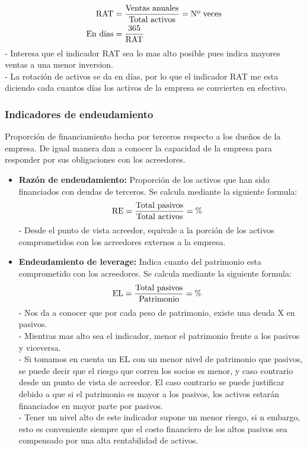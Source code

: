 \documentclass{templateNote}
\begin{document}
\begin{itemize}
    \begin{align*}
        \textnormal{RAT} &= \frac{\textnormal{Ventas anuales}}{\textnormal{Total activos}} = \textnormal{Nº veces} \\
        \textnormal{En días} &= \frac{365}{\textnormal{RAT}}
    \end{align*} 
    - Interesa que el indicador RAT sea lo mas alto posible pues indica mayores ventas a una menor inversion. \\
    - La rotación de activos se da en días, por lo que el indicador RAT me esta diciendo cada cuantos días los activos de la empresa se convierten en efectivo.
\end{itemize}

\subsubsection{Indicadores de endeudamiento}
\noindent Proporción de financiamiento hecha por terceros respecto a los dueños de la empresa. De igual manera dan a conocer la capacidad de la empresa para responder por 
sus obligaciones con los acreedores.

\begin{itemize}
    \item \textbf{Razón de endeudamiento:} Proporción de los activos que han sido financiados con deudas de terceros. Se calcula mediante la siguiente formula:
    \begin{align*}
        \textnormal{RE} &= \frac{\textnormal{Total pasivos}}{\textnormal{Total activos}} = \%
    \end{align*}
    - Desde el punto de vista acreedor, equivale a la porción de los activos comprometidos con los acreedores externos a la empresa.
    \item \textbf{Endeudamiento de leverage:} Indica cuanto del patrimonio esta comprometido con los acreedores. Se calcula mediante la siguiente formula: 
    \begin{align*}
        \textnormal{EL} &= \frac{\textnormal{Total pasivos}}{\textnormal{Patrimonio}} = \%
    \end{align*}
    - Nos da a conocer que por cada peso de patrimonio, existe una deuda X en pasivos. \\
    - Mientras mas alto sea el indicador, menor el patrimonio frente a los pasivos y viceversa. \\
    - Si tomamos en cuenta un EL con un menor nivel de patrimonio que pasivos, se puede decir que el riesgo que corren los socios es menor, y caso contrario desde un punto de vista de acreedor. El caso
    contrario se puede justificar debido a que si el patrimonio es mayor a los pasivos, los activos estarán financiados en mayor parte por pasivos. \\
    - Tener un nivel alto de este indicador supone un menor riesgo, si  n embargo, esto es conveniente siempre que el costo financiero de los
    altos pasivos sea compensado por una alta rentabilidad de activos.
\end{itemize}
\end{document}
